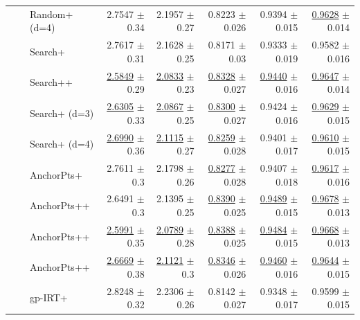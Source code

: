 \begin{longtable}{llp{}rrrrr}
 &  & Random+ (d=4) & 2.7547 {\scriptsize $\pm$ 0.34} & 2.1957 {\scriptsize $\pm$ 0.27} & 0.8223 {\scriptsize $\pm$ 0.026} & 0.9394 {\scriptsize $\pm$ 0.015} & \underline{0.9628} {\scriptsize $\pm$ 0.014} \\
 &  & Search+ & 2.7617 {\scriptsize $\pm$ 0.31} & 2.1628 {\scriptsize $\pm$ 0.25} & 0.8171 {\scriptsize $\pm$ 0.03} & 0.9333 {\scriptsize $\pm$ 0.019} & 0.9582 {\scriptsize $\pm$ 0.016} \\
 &  & Search++ & \underline{2.5849} {\scriptsize $\pm$ 0.29} & \underline{2.0833} {\scriptsize $\pm$ 0.23} & \underline{0.8328} {\scriptsize $\pm$ 0.027} & \underline{0.9440} {\scriptsize $\pm$ 0.016} & \underline{0.9647} {\scriptsize $\pm$ 0.014} \\
 &  & Search+ (d=3) & \underline{2.6305} {\scriptsize $\pm$ 0.33} & \underline{2.0867} {\scriptsize $\pm$ 0.25} & \underline{0.8300} {\scriptsize $\pm$ 0.027} & 0.9424 {\scriptsize $\pm$ 0.016} & \underline{0.9629} {\scriptsize $\pm$ 0.015} \\
 &  & Search+ (d=4) & \underline{2.6990} {\scriptsize $\pm$ 0.36} & \underline{2.1115} {\scriptsize $\pm$ 0.27} & \underline{0.8259} {\scriptsize $\pm$ 0.028} & 0.9401 {\scriptsize $\pm$ 0.017} & \underline{0.9610} {\scriptsize $\pm$ 0.015} \\
 &  & AnchorPts+ & 2.7611 {\scriptsize $\pm$ 0.3} & 2.1798 {\scriptsize $\pm$ 0.26} & \underline{0.8277} {\scriptsize $\pm$ 0.028} & 0.9407 {\scriptsize $\pm$ 0.018} & \underline{0.9617} {\scriptsize $\pm$ 0.016} \\
 &  & AnchorPts++ & 2.6491 {\scriptsize $\pm$ 0.3} & 2.1395 {\scriptsize $\pm$ 0.25} & \underline{0.8390} {\scriptsize $\pm$ 0.025} & \underline{0.9489} {\scriptsize $\pm$ 0.015} & \underline{0.9678} {\scriptsize $\pm$ 0.013} \\
 &  & AnchorPts++ & \underline{2.5991} {\scriptsize $\pm$ 0.35} & \underline{2.0789} {\scriptsize $\pm$ 0.28} & \underline{0.8388} {\scriptsize $\pm$ 0.025} & \underline{0.9484} {\scriptsize $\pm$ 0.015} & \underline{0.9668} {\scriptsize $\pm$ 0.013} \\
 &  & AnchorPts++ & \underline{2.6669} {\scriptsize $\pm$ 0.38} & \underline{2.1121} {\scriptsize $\pm$ 0.3} & \underline{0.8346} {\scriptsize $\pm$ 0.026} & \underline{0.9460} {\scriptsize $\pm$ 0.016} & \underline{0.9644} {\scriptsize $\pm$ 0.015} \\
 &  & gp-IRT+ & 2.8248 {\scriptsize $\pm$ 0.32} & 2.2306 {\scriptsize $\pm$ 0.26} & 0.8142 {\scriptsize $\pm$ 0.027} & 0.9348 {\scriptsize $\pm$ 0.017} & 0.9599 {\scriptsize $\pm$ 0.015} \\

\end{longtable}
